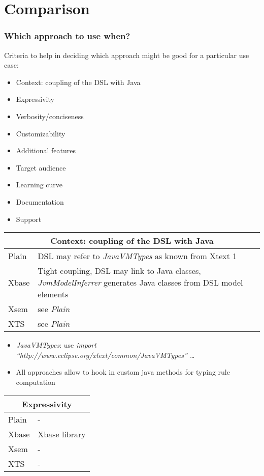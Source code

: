 \section{Comparison}

\begin{frame}
  \frametitle{Which approach to use when?}
  
  Criteria to help in deciding which approach might be good for a particular use
  case:
  \begin{itemize}
    \item Context: coupling of the DSL with Java
    \item Expressivity
    \item Verbosity/conciseness
    \item Customizability
    \item Additional features
    \item Target audience
    \item Learning curve
    \item Documentation
    \item Support
  \end{itemize}
  
\begin{tabularx}{\linewidth}{ l   X }
\multicolumn{2}{c}{Context: coupling of the DSL with Java} \\ \hline
Plain & DSL may refer to \emph{JavaVMTypes} as known from Xtext 1\\
Xbase & Tight coupling, DSL may link to Java classes, \emph{JvmModelInferrer}
generates Java classes from DSL model elements\\
Xsem & see \emph{Plain} \\
XTS & see \emph{Plain} \\
\end{tabularx}
\begin{itemize}
  \item \emph{JavaVMTypes}: use \emph{import
  ``http://\-www.eclipse.org/\-xtext/\-common/\-JavaVMTypes'' \ldots}
  \item All approaches allow to hook in custom java methods for typing rule
  computation
\end{itemize}

\begin{tabularx}{\linewidth}{ l   X }
\multicolumn{2}{c}{Expressivity} \\ \hline
Plain & - \\
Xbase & Xbase library \\
Xsem & - \\
XTS & - \\
\end{tabularx}


\end{frame}
